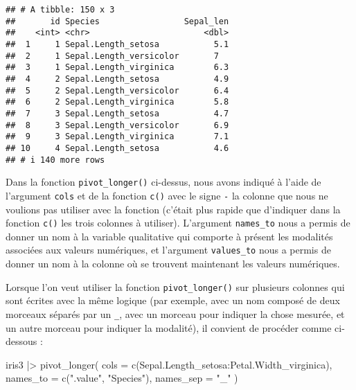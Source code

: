 \documentclass[
]{book}
\newenvironment{Shaded}{\begin{snugshade}}{\end{snugshade}}
\newcommand{\AttributeTok}[1]{\textcolor[rgb]{0.77,0.63,0.00}{#1}}
\newcommand{\FunctionTok}[1]{\textcolor[rgb]{0.00,0.00,0.00}{#1}}
\newcommand{\NormalTok}[1]{#1}
\newcommand{\SpecialCharTok}[1]{\textcolor[rgb]{0.00,0.00,0.00}{#1}}
\newcommand{\StringTok}[1]{\textcolor[rgb]{0.31,0.60,0.02}{#1}}
\begin{document}
\begin{verbatim}
## # A tibble: 150 x 3
##       id Species                 Sepal_len
##    <int> <chr>                       <dbl>
##  1     1 Sepal.Length_setosa           5.1
##  2     1 Sepal.Length_versicolor       7  
##  3     1 Sepal.Length_virginica        6.3
##  4     2 Sepal.Length_setosa           4.9
##  5     2 Sepal.Length_versicolor       6.4
##  6     2 Sepal.Length_virginica        5.8
##  7     3 Sepal.Length_setosa           4.7
##  8     3 Sepal.Length_versicolor       6.9
##  9     3 Sepal.Length_virginica        7.1
## 10     4 Sepal.Length_setosa           4.6
## # i 140 more rows
\end{verbatim}

Dans la fonction \texttt{pivot\_longer()} ci-dessus, nous avons indiqué à l'aide de l'argument \texttt{cols} et de la fonction \texttt{c()} avec le signe \texttt{-} la colonne que nous ne voulions pas utiliser avec la fonction (c'était plus rapide que d'indiquer dans la fonction \texttt{c()} les trois colonnes à utiliser). L'argument \texttt{names\_to} nous a permis de donner un nom à la variable qualitative qui comporte à présent les modalités associées aux valeurs numériques, et l'argument \texttt{values\_to} nous a permis de donner un nom à la colonne où se trouvent maintenant les valeurs numériques.

Lorsque l'on veut utiliser la fonction \texttt{pivot\_longer()} sur plusieurs colonnes qui sont écrites avec la même logique (par exemple, avec un nom composé de deux morceaux séparés par un \texttt{\_}, avec un morceau pour indiquer la chose mesurée, et un autre morceau pour indiquer la modalité), il convient de procéder comme ci-dessous :

\begin{Shaded}
\begin{Highlighting}[]
\NormalTok{iris3 }\SpecialCharTok{|\textgreater{}} 
  \FunctionTok{pivot\_longer}\NormalTok{(}
    \AttributeTok{cols =} \FunctionTok{c}\NormalTok{(Sepal.Length\_setosa}\SpecialCharTok{:}\NormalTok{Petal.Width\_virginica),}
    \AttributeTok{names\_to =} \FunctionTok{c}\NormalTok{(}\StringTok{".value"}\NormalTok{, }\StringTok{"Species"}\NormalTok{),}
    \AttributeTok{names\_sep =} \StringTok{"\_"}
\NormalTok{  )}
\end{Highlighting}
\end{Shaded}
\end{document}
